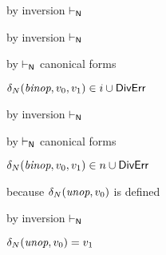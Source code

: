 {\begin{lamportproof*}
    \begin{pfproof}
        \begin{pfproof}
          by inversion $\vdash_{\mathsf{N}}$
        \end{pfproof}
        \begin{pfproof}
            \begin{pfproof}
              by inversion $\vdash_{\mathsf{N}}$
            \end{pfproof}
            \begin{pfproof}
              by $\vdash_{\mathsf{N}}$ canonical forms
            \end{pfproof}
          \qedstep
            \begin{pfproof}
              $\delta_{N}(\textit{binop}, v_0, v_1) \in i \cup \mathsf{DivErr}$
            \end{pfproof}
        \end{pfproof}
        \begin{pfproof}
            \begin{pfproof}
              by inversion $\vdash_{\mathsf{N}}$
            \end{pfproof}
            \begin{pfproof}
              by $\vdash_{\mathsf{N}}$ canonical forms
            \end{pfproof}
          \qedstep
            \begin{pfproof}
              $\delta_{N}(\textit{binop}, v_0, v_1) \in n \cup \mathsf{DivErr}$
            \end{pfproof}
        \end{pfproof}
    \end{pfproof}

    \begin{pfproof}
        \begin{pfproof}
          because $\delta_{N}(\textit{unop}, v_0)$ is defined
        \end{pfproof}
        \begin{pfproof}
          by inversion $\vdash_{\mathsf{N}}$
        \end{pfproof}
      \qedstep
        \begin{pfproof}
          $\delta_{N}(\textit{unop}, v_0) = v_1$
        \end{pfproof}
    \end{pfproof}


\end{lamportproof*}}
